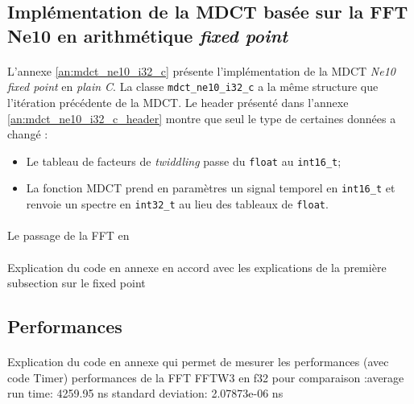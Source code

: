 \documentclass{article}
\begin{document}



    \subsection{Implémentation de la MDCT basée sur la FFT Ne10 en arithmétique \emph{fixed point}}
    \paragraph{}
    L'annexe \ref{an:mdct_ne10_i32_c} présente l'implémentation de la MDCT \emph{Ne10 fixed point} en \emph{plain C}. La classe \texttt{mdct\_ne10\_i32\_c} a la même structure que l'itération précédente de la MDCT. Le header présenté dans l'annexe \ref{an:mdct_ne10_i32_c_header} montre que seul le type de certaines données a changé :
    \begin{itemize}
        \item Le tableau de facteurs de \emph{twiddling} passe du \texttt{float} au \texttt{int16\_t};
        \item La fonction MDCT prend en paramètres un signal temporel en \texttt{int16\_t} et renvoie un spectre en \texttt{int32\_t} au lieu des tableaux de \texttt{float}.
    \end{itemize}

    \paragraph{}
    Le passage de la FFT en \emph{}


    \paragraph{}
    Explication du code en annexe en accord avec les explications de la première subsection sur le fixed point

    \subsection{Performances}
    \paragraph{}
    Explication du code en annexe qui permet de mesurer les performances (avec code Timer)
    performances de la FFT FFTW3 en f32 pour comparaison :average run time:   4259.95 ns
    standard deviation: 2.07873e-06 ns
\end{document}
